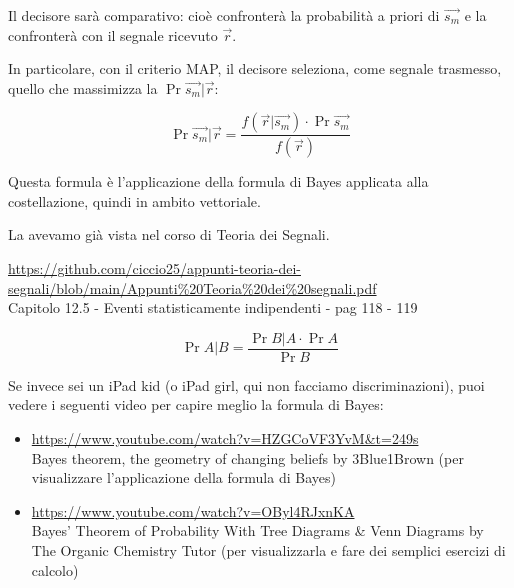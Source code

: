 Il decisore sarà comparativo: cioè confronterà la probabilità a priori di $\overrightarrow{s_m}$ e la confronterà con il segnale ricevuto $\overrightarrow{r}$. \newline 

In particolare, con il criterio MAP, 
il decisore seleziona, come segnale trasmesso, quello che massimizza la $\Pr {\overrightarrow{s_m} | \overrightarrow{r}}$: 

{
    \Large 
    \begin{equation}
        \Pr {\overrightarrow{s_m} | \overrightarrow{r}}
        = 
        \frac{f (\overrightarrow{r} | \overrightarrow{s_m}) \cdot \Pr {\overrightarrow{s_m}}}{f(\overrightarrow{r})}
    \end{equation}
}

\begin{tcolorbox}
    Questa formula è l'applicazione della formula di Bayes applicata alla costellazione, 
    quindi in ambito vettoriale. \newline 

    La avevamo già vista nel corso di Teoria dei Segnali. \newline 

    \url{https://github.com/ciccio25/appunti-teoria-dei-segnali/blob/main/Appunti%20Teoria%20dei%20segnali.pdf} \\
    Capitolo 12.5 - Eventi statisticamente indipendenti - pag 118 - 119 \newline 

    \begin{equation}
        \Pr{A | B} = \frac{\Pr{B | A} \cdot \Pr{A}}{\Pr{B}}
    \end{equation}
   

    Se invece sei un iPad kid (o iPad girl, qui non facciamo discriminazioni), 
    puoi vedere i seguenti video per capire meglio la formula di Bayes: 

    \begin{itemize}
        \item \url{https://www.youtube.com/watch?v=HZGCoVF3YvM&t=249s} \\ Bayes theorem, the geometry of changing beliefs by 3Blue1Brown (per visualizzare l'applicazione della formula di Bayes) 
        \item \url{https://www.youtube.com/watch?v=OByl4RJxnKA} \\ Bayes' Theorem of Probability With Tree Diagrams \& Venn Diagrams by The Organic Chemistry Tutor (per visualizzarla e fare dei semplici esercizi di calcolo)
    \end{itemize}

\end{tcolorbox}

